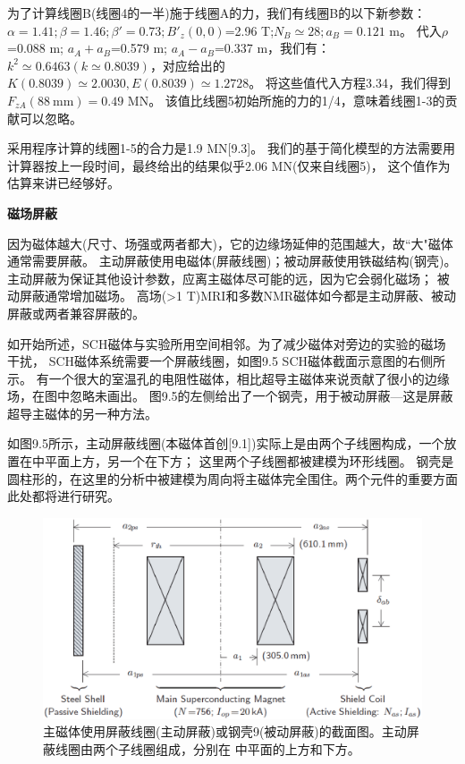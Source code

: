 为了计算线圈B(线圈4的一半)施于线圈A的力，我们有线圈B的以下新参数：
$\alpha=1.41;\beta=1.46;\beta'=0.73;B'_z(0,0)$=2.96 T;$N_B\simeq 28; a_B=0.121$ m。
代入$\rho$=0.088 m; $a_A+a_B$=0.579 m; $a_A-a_B$=0.337 m，我们有：
$k^2\simeq 0.6463(k\simeq 0.8039)$，对应给出的$K(0.8039)\simeq 2.0030, E(0.8039)\simeq 1.2728$。
将这些值代入方程3.34，我们得到$F_{zA}(88\ \mathrm{mm})=0.49$ MN。
该值比线圈5初始所施的力的1/4，意味着线圈1-3的贡献可以忽略。

采用程序计算的线圈1-5的合力是1.9 MN[9.3]。
我们的基于简化模型的方法需要用计算器按上一段时间，最终给出的结果似乎2.06 MN(仅来自线圈5)，
这个值作为估算来讲已经够好。

\textbf{磁场屏蔽}

因为磁体越大(尺寸、场强或两者都大)，它的边缘场延伸的范围越大，故``大"磁体通常需要屏蔽。
主动屏蔽使用电磁体(屏蔽线圈)；被动屏蔽使用铁磁结构(钢壳)。
主动屏蔽为保证其他设计参数，应离主磁体尽可能的远，因为它会弱化磁场；
被动屏蔽通常增加磁场。
高场(>1 T)MRI和多数NMR磁体如今都是主动屏蔽、被动屏蔽或两者兼容屏蔽的。

如开始所述，SCH磁体与实验所用空间相邻。为了减少磁体对旁边的实验的磁场干扰，
SCH磁体系统需要一个屏蔽线圈，如图9.5 SCH磁体截面示意图的右侧所示。
有一个很大的室温孔的电阻性磁体，相比超导主磁体来说贡献了很小的边缘场，在图中忽略未画出。
图9.5的左侧给出了一个钢壳，用于被动屏蔽---这是屏蔽超导主磁体的另一种方法。

如图9.5所示，主动屏蔽线圈(本磁体首创[9.1])实际上是由两个子线圈构成，一个放置在中平面上方，另一个在下方；
这里两个子线圈都被建模为环形线圈。
钢壳是圆柱形的，在这里的分析中被建模为周向将主磁体完全围住。两个元件的重要方面此处都将进行研究。

\begin{figure}[htbp]
	\centering
	\includegraphics[scale=0.6]{chpt9/figs/fig9.5.eps}
	\caption{主磁体使用屏蔽线圈(主动屏蔽)或钢壳9(被动屏蔽)的截面图。主动屏蔽线圈由两个子线圈组成，分别在
		中平面的上方和下方。}
\end{figure}

